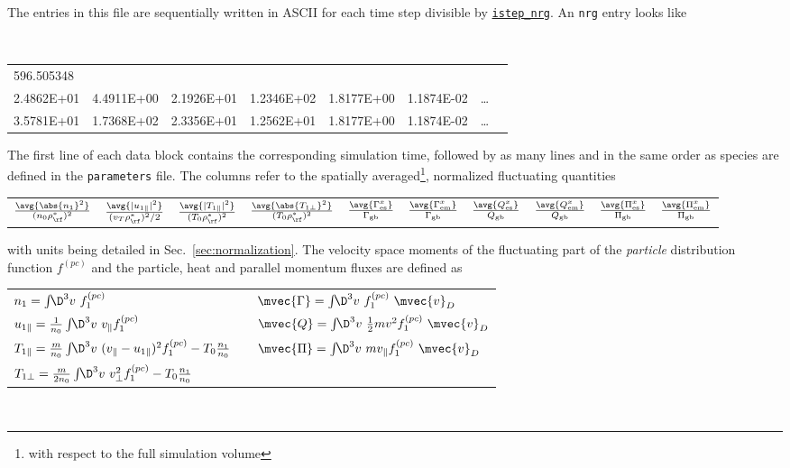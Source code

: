 \documentclass[12pt]{article}
\begin{document}
The entries in this file are sequentially written in ASCII for each time step divisible by
\hyperlink{istep_nrg}{\tt istep\_nrg}. An {\tt nrg} entry looks like
\begin{center}
\scriptsize \tt
\begin{tabular}{llllllll}
596.505348 & & & & & & &\\
2.4862E+01 & 4.4911E+00 & 2.1926E+01 & 1.2346E+02 & 1.8177E+00 & 1.1874E-02 & \ldots \\ %
3.5781E+01 & 1.7368E+02 & 2.3356E+01 & 1.2562E+01 & 1.8177E+00 & 1.1874E-02 & \ldots %
\end{tabular}
\end{center}
The first line of each data block contains the corresponding simulation time,
followed by as many lines and in the same order as species are defined in
the {\tt parameters} file. The columns refer to the spatially averaged\footnote{with respect to the full simulation
volume}, normalized fluctuating quantities\\[-5ex]
\begin{center}
\begin{tabular}{*{10}{c}} %
$\frac{\avg{\abs{n_1}^2}}{(n_0\rho_{\rf}^*)^2}$ & $\frac{\avg{|u_{1\parallel}|^2}}{(v_T \rho_\rf^*)^2/2}$ &
$\frac{{\avg{|T_{1\parallel}|^2}}}{(T_0 \rho_\rf^*)^2}$ & $\frac{{\avg{\abs{T_{1\perp}}^2}}}{(T_0 \rho_\rf^*)^2}$ &
$\frac{\avg{\Gamma_{\rm es}^x}}{\Gamma_{\rm gb}}$ & $\frac{\avg{\Gamma_{\rm em}^x}}{\Gamma_{\rm gb}}$ &
$\frac{\avg{Q_{\rm es}^x}}{Q_{\rm gb}}$ & $\frac{\avg{Q_{\rm em}^x}}{Q_{\rm gb}}$ &
$\frac{\avg{\Pi_{\rm es}^x}}{\Pi_{\rm gb}}$ & $\frac{\avg{\Pi_{\rm em}^x}}{\Pi_{\rm gb}}$ \\
\end{tabular}
\end{center}
with units being detailed in Sec.~\ref{sec:normalization}.
The velocity space moments of the fluctuating part of the {\em particle} distribution function $f^{(pc)}$ and the
particle, heat and parallel momentum fluxes are defined as\\[1ex]
\begin{tabular}{lp{3em}l}
$n_{1} = \int\!\!\D^3v\,\, f_1^{(pc)}$                     & & $\mvec{\Gamma} = \int\!\!\D^3v\,\, f_1^{(pc)}\,\, \mvec{v}_D$ \\
$u_{1\|} = \frac{1}{n_0} \int\!\!\D^3v\,\,v_\| f_1^{(pc)}$ & & $\mvec{Q} = \int\!\!\D^3v\,\, \frac{1}{2}m v^2 f_1^{(pc)}\,\, \mvec{v}_D$ \\
$T_{1\|} = \frac{m}{n_{0}} \int\!\!\D^3v\,\,(v_\|-u_{1\|})^2 f_1^{(pc)} - T_{0} \frac{n_{1}}{n_{0}}$ & &
$\mvec{\Pi} = \int\!\!\D^3v\,\, m v_{\|} f_1^{(pc)}\,\, \mvec{v}_D$ \\
$T_{1\perp} = \frac{m}{2n_{0}} \int\!\!\D^3v\,\,v_\perp^2 f_1^{(pc)} - T_{0} \frac{n_{1}}{n_0}$ & \\
\end{tabular}\\[1ex]
\end{document}
